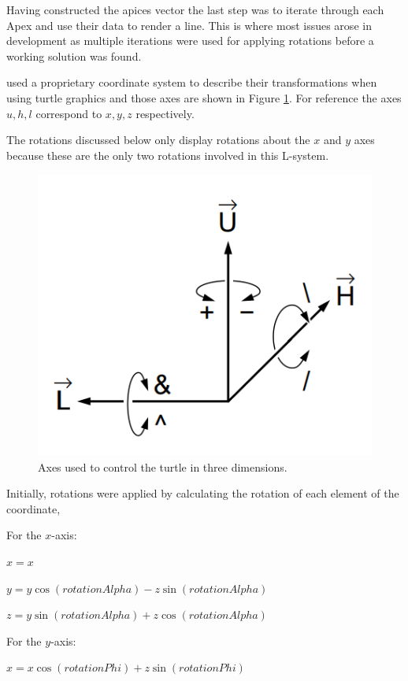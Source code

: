 \documentclass[final]{cmpreport}
\begin{document}
Having constructed the apices vector the last step was to iterate through each Apex and use their 
data to render a line. This is where most issues arose in development as multiple iterations were 
used for applying rotations before a working solution was found.

\cite{prusinkiewicz1996systems} used a proprietary coordinate system to describe their transformations 
when using turtle graphics and those axes are shown in Figure \ref{fig:uhl-coords}. For reference 
the axes $u, h, l$ correspond to $x, y, z$ respectively. 

The rotations discussed below only display rotations about the $x$ and $y$ axes because these 
are the only two rotations involved in this L-system.

\begin{figure}[ht]
    \includegraphics[scale=0.4]{uhl-coords.PNG} 
    \centering
    \captionsetup{justification=centering}
    \caption{Axes used to control the turtle in three dimensions.}
    \label{fig:uhl-coords}
\end{figure}

\pagebreak
Initially, rotations were applied by calculating the rotation of each element of the coordinate,

For the $x$-axis:

$x = x$

$y = y\cos(rotationAlpha) - z\sin(rotationAlpha)$

$z = y\sin(rotationAlpha) + z\cos(rotationAlpha)$

For the $y$-axis:

$x = x\cos(rotationPhi) + z\sin(rotationPhi)$
\end{document}
